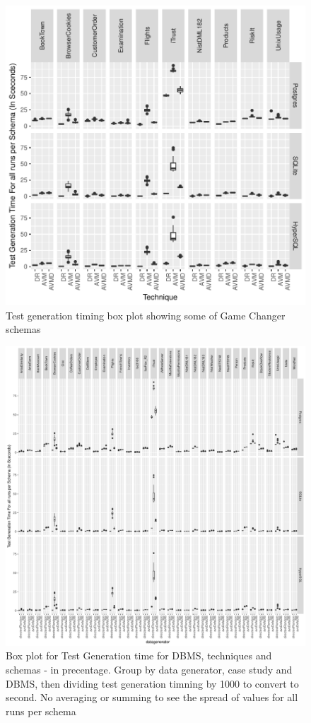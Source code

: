 \documentclass[runningheads,a4paper]{llncs}
\begin{document}
\begin{figure}[h]
	\centering
	\includegraphics[width=\linewidth]{../plots/figure24.pdf}
	\caption{Test generation timing box plot showing some of Game Changer schemas}
\end{figure}

\begin{figure}[h]
\centering
\includegraphics[width=\linewidth]{../plots/figure4.pdf}
\caption{Box plot for Test Generation time for DBMS, techniques and
schemas - in precentage. Group by data generator, case study and DBMS,
then dividing test generation timning by 1000 to convert to second. No
averaging or summing to see the spread of values for all runs per
schema}
\end{figure}
\end{document}
